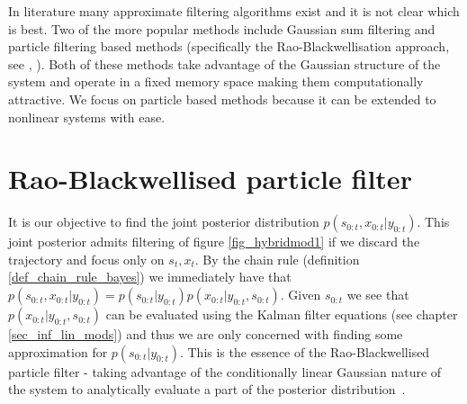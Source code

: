In literature many approximate filtering algorithms exist and it is not clear which is best. Two of the more popular methods include Gaussian sum filtering \cite{barber2} and particle filtering based methods (specifically the Rao-Blackwellisation approach, see \cite{chen}, \cite{doucet}). Both of these methods take advantage of the Gaussian structure of the system and operate in a fixed memory space making them computationally attractive. We focus on particle based methods because it can be extended to nonlinear systems with ease.   

\section{Rao-Blackwellised particle filter}
It is our objective to find the joint posterior distribution $p(s_{0:t}, x_{0:t}|y_{0:t})$. This joint posterior admits filtering of figure \ref{fig_hybridmod1} if we discard the trajectory and focus only on $s_t,x_t$. By the chain rule (definition \ref{def_chain_rule_bayes}) we immediately have that $p(s_{0:t}, x_{0:t}|y_{0:t}) = p(s_{0:t}|y_{0:t})p(x_{0:t}|y_{0:t}, s_{0:t})$. Given $s_{0:t}$ we see that $p(x_{0:t}|y_{0:t}, s_{0:t})$ can be evaluated using the Kalman filter equations (see chapter \ref{sec_inf_lin_mods}) and thus we are only concerned with finding some approximation for $p(s_{0:t}|y_{0:t})$. This is the essence of the Rao-Blackwellised particle filter - taking advantage of the conditionally linear Gaussian nature of the system to analytically evaluate a part of the posterior distribution~\cite{doucet}.

